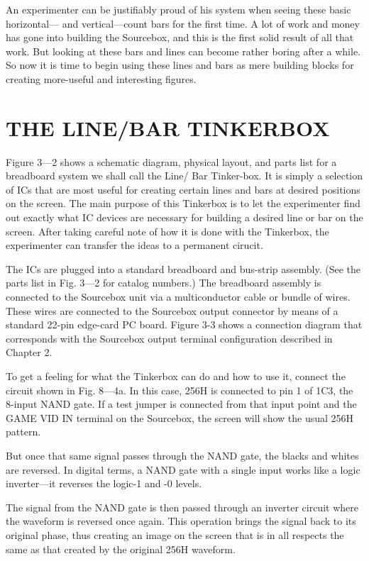 \documentclass[11pt]{book}              %
\begin{document}
An experimenter can be justifiably proud of his system when seeing these basic horizontal— and vertical—count bars for the first time. A lot of work and money has gone into building the Sourcebox, and this is the first solid result of all that work. But looking at these bars and lines can become rather boring after a while. So now it is time to begin using these lines and bars as mere building blocks for creating more-useful and interesting figures.

\section{THE LINE/BAR TINKERBOX}

Figure 3—2 shows a schematic diagram, physical layout, and parts list for a breadboard system we shall call the Line/ Bar Tinker-box. It is simply a selection of ICs that are most useful for creating certain lines and bars at desired positions on the screen. The main purpose of this Tinkerbox is to let the experimenter find out exactly what IC devices are necessary for building a desired line or bar on the screen. After taking careful note of how it is done with the Tinkerbox, the experimenter can transfer the ideas to a permanent cirucit.

The ICs are plugged into a standard breadboard and bus-strip assembly. (See the parts list in Fig. 3—2 for catalog numbers.) The breadboard assembly is connected to the Sourcebox unit via a multiconductor cable or bundle of wires. These wires are connected to the Sourcebox output connector by means of a standard 22-pin edge-card PC board. Figure 3-3 shows a connection diagram that corresponds with the Sourcebox output terminal configuration described in Chapter 2.


To get a feeling for what the Tinkerbox can do and how to use it, connect the circuit shown in Fig. 8—4a. In this case, 256H is connected to pin 1 of 1C3, the 8-input NAND gate. If a test jumper is connected from that input point and the GAME VID IN terminal on the Sourcebox, the screen will show the usual 256H pattern.

But once that same signal passes through the NAND gate, the blacks and whites are reversed. In digital terms, a NAND gate with a single input works like a logic inverter—it reverses the logic-1 and -0 levels.

The signal from the NAND gate is then passed through an inverter circuit where the waveform is reversed once again. This operation brings the signal back to its original phase, thus creating an image on the screen that is in all respects the same as that created by the original 256H waveform.
\end{document}
